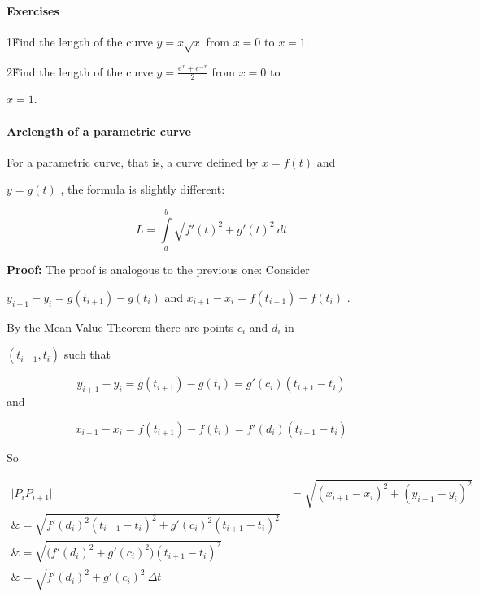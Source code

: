 \paragraph{Exercises}



1\. Find the length of the curve $y=x\sqrt{x}$ from $x=0$ to $x=1$.



2\. Find the length of the curve $y=\frac{e^x+e^{-x}}{2}$ from $x=0$ to

$x=1$.



\paragraph{Arclength of a parametric curve}



For a parametric curve, that is, a curve defined by $x=f(t)$ and

$y=g(t)$ , the formula is slightly different:



$$L=\int\limits _a^b \sqrt{f'(t)^2+g'(t)^2}\,dt$$



\textbf{Proof:} The proof is analogous to the previous one: Consider

$y _{i+1}-y _i=g(t _{i+1})-g(t _i)$ and $x _{i+1}-x _i=f(t _{i+1})-f(t _i)$ .



By the Mean Value Theorem there are points $c _i$ and $d _i$ in

$(t _{i+1},t _i)$ such that



$$y _{i+1}-y _i=g(t _{i+1})-g(t _i)=g'(c _i)(t _{i+1}-t _i)$$ and



$$x _{i+1}-x _i=f(t _{i+1})-f(t _i)=f'(d _i)(t _{i+1}-t _i)$$



So



\begin{align}
\bigl|P _iP _{i+1}\bigr| 

&= \sqrt{(x _{i+1} - x _i)^2 + (y _{i+1} - y _i)^2} \\\&= \sqrt{f'(d _i)^2(t _{i+1} - t _i)^2 + g'(c _i)^2(t _{i+1} - t _i)^2} \\\&= \sqrt{\bigl(f'(d _i)^2 + g'(c _i)^2\bigr)(t _{i+1} - t _i)^2} \\\&= \sqrt{f'(d _i)^2 + g'(c _i)^2}\,\Delta t
\end{align}




